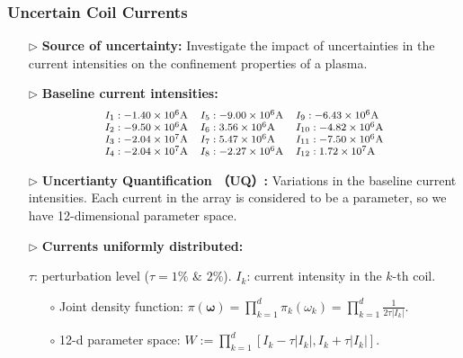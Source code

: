 \documentclass{beamer}
\begin{document}
\begin{frame}[t]
    \frametitle{Uncertain Coil Currents}
    \begin{itemize}[leftmargin=5pt]
        \item[$\triangleright$] \textcolor{myblue3}{\bf Source of uncertainty:} {\footnotesize Investigate the impact of \textcolor{myblue3}{uncertainties in the current intensities} on the confinement properties of a plasma.}
        
        \item[$\triangleright$] \textcolor{myred}{\bf Baseline current intensities:} 
        \[
        \footnotesize
        \begin{array}{lll}
        I_1: -1.40\times 10^6\text{A} &I_5: -9.00\times 10^6\text{A} &I_9:  -6.43\times 10^6\text{A} \\
        I_2: -9.50\times 10^6\text{A} &I_6: 3.56\times 10^6\text{A}  & I_{10}:  -4.82\times 10^6\text{A} \\
        I_3: -2.04\times 10^7\text{A} &I_7:  5.47\times 10^6\text{A}  &I_{11}:  -7.50\times 10^6\text{A} \\
        I_4: -2.04\times 10^7\text{A} &I_8: -2.27\times 10^6\text{A} &I_{12}:  1.72\times 10^7\text{A} 
        \end{array}
        \]
        \item[$\triangleright$] \textcolor{myblue3}{\bf Uncertianty Quantification （UQ）:} {\footnotesize Variations in the baseline current intensities. Each current in the array is considered to be a parameter, so we have 12-dimensional parameter space.}
        
        
        \item[$\triangleright$] \textcolor{myblue3}{\bf Currents uniformly distributed:} 

        {\footnotesize
        \textcolor{mygray3}{$\tau$: perturbation level ($\tau= 1\%$ \& $2\%$). \quad $I_k$: current intensity in the $k$-th coil.}
        

        \begin{itemize}[leftmargin=15pt]   
            \item[$\circ$] Joint density function: $\displaystyle
             \pi \left(\boldsymbol{\omega}\right)=\prod_{k=1}^{d} \pi_k\left(\omega_{k}\right)=\prod_{k=1}^{d} \frac{1}{2\tau |I_k|}$.
            \item[$\circ$] 12-d parameter space: $\displaystyle W := \prod_{k=1}^{d}\left[I_k-\tau|I_k|,I_k+\tau|I_k|\right]$.
        \end{itemize}
        \par}
    \end{itemize}
\end{frame}	
\end{document}
